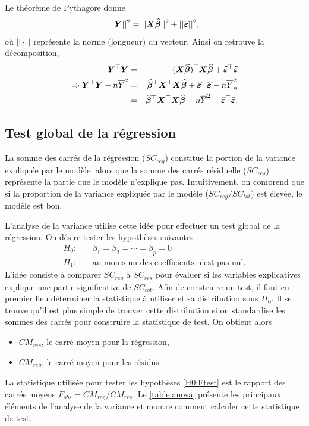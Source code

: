 Le théorème de Pythagore donne
$$||\bm{Y}||^2=||\bm{X}\widehat{\bm\beta}||^2+||\widehat{\bm\varepsilon}||^2,$$
o\`u $||\cdot||$ représente la norme (longueur) du vecteur.
Ainsi on retrouve la décomposition,
\begin{eqnarray*}
\bm{Y}^\top\bm{Y}&=&(\bm{X}\widehat{\bm\beta})^\top\bm{X}\widehat{\bm\beta}+\widehat{\bm\varepsilon}^\top\widehat{\bm\varepsilon}\\
\Rightarrow\bm{Y}^\top\bm{Y}-n\overline{Y}^2&=&\widehat{\bm\beta}^\top\bm{X}^\top\bm{X}\widehat{\bm\beta}
+\widehat{\bm\varepsilon}^\top\widehat{\bm\varepsilon}-n\overline{Y}^2_n\\
&=&\widehat{\bm\beta}^\top\bm{X}^\top\bm{X}\widehat{\bm\beta}-n\overline{Y}^2+\widehat{\bm\varepsilon}^\top\widehat{\bm\varepsilon}.
\end{eqnarray*}


\subsection{Test global de la régression}

La somme des carrés de la régression ($SC_{reg}$) constitue la portion de la variance expliquée par le modèle, alors que la somme des carrés résiduelle ($SC_{res}$) représente la partie que le modèle n'explique pas. Intuitivement, on comprend que si la proportion de la variance expliquée par le modèle ($SC_{reg}/SC_{tot}$) est élevée, le modèle est bon.

L'analyse de la variance utilise cette idée pour effectuer un test global de la régression. On désire tester les hypothèses suivantes
\begin{eqnarray}
H_0:&~&\beta_1=\beta_2=\cdots=\beta_{p}=0\label{H0:Ftest}\\
H_1:&~&\mbox{au moins un des coefficients n'est pas nul.}\nonumber
\end{eqnarray}
L'idée consiste à comparer $SC_{reg}$ à $SC_{res}$ pour évaluer si les variables explicatives explique une partie significative de $SC_{tot}$. Afin de construire un test, il faut en premier lieu déterminer la statistique à utiliser et sa distribution  sous $H_0$. Il se trouve qu'il est plus simple de trouver cette distribution si on standardise les sommes des carrés pour construire la statistique de test. On obtient alors 
\begin{itemize}
    \item $CM_{res}$, le carré moyen pour la régression, 
    \item $CM_{reg}$, le carré moyen pour les résidus.
\end{itemize} 
La statistique utilisée pour tester les hypothèses \ref{H0:Ftest} est le rapport des carrés moyens $F_{obs} = CM_{reg}/CM_{res}$. Le \autoref{table:anova} présente les principaux éléments de l'analyse de la variance et montre comment calculer cette statistique de test.


